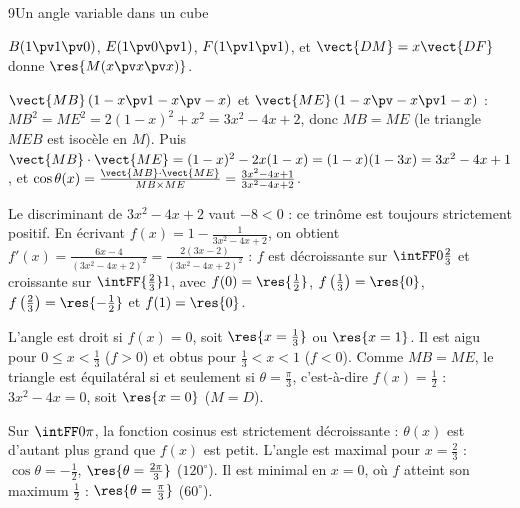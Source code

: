 \corrigesSouples
\begin{corrige}{9}{Un angle variable dans un cube}
\begin{questions}
  \item $B(1\pv1\pv0)$, $E(1\pv0\pv1)$, $F(1\pv1\pv1)$, et $\vect{DM}=x\vect{DF}$ donne $\res{M(x\pv x\pv x)}$.
  \item $\vect{MB}\,(1-x\pv1-x\pv-x)$ et $\vect{ME}\,(1-x\pv-x\pv1-x)$ : $MB^2=ME^2=2(1-x)^2+x^2=3x^2-4x+2$, donc $MB=ME$ (le
    triangle $MEB$ est isocèle en $M$). Puis $\vect{MB}\cdot\vect{ME}=(1-x)^2-2x(1-x)=(1-x)(1-3x)=3x^2-4x+1$, et
    $\cos\theta(x)=\frac{\vect{MB}\cdot\vect{ME}}{MB\times ME}=\frac{3x^2-4x+1}{3x^2-4x+2}$.
  \item Le discriminant de $3x^2-4x+2$ vaut $-8<0$ : ce trinôme est toujours strictement positif. En écrivant
    $f(x)=1-\frac{1}{3x^2-4x+2}$, on obtient $f'(x)=\frac{6x-4}{(3x^2-4x+2)^2}=\frac{2(3x-2)}{(3x^2-4x+2)^2}$ : $f$ est décroissante
    sur $\intFF0{\frac23}$ et croissante sur $\intFF{\frac23}1$, avec $f(0)=\res{\tfrac12}$, $f\left(\tfrac13\right)=\res{0}$,
    $f\left(\tfrac23\right)=\res{-\tfrac12}$ et $f(1)=\res{0}$.
  \item L'angle est droit si $f(x)=0$, soit $\res{x=\tfrac13}$ ou $\res{x=1}$. Il est aigu pour $0\leq x<\frac13$ ($f>0$) et obtus pour
    $\frac13<x<1$ ($f<0$). Comme $MB=ME$, le triangle est équilatéral si et seulement si $\theta=\frac{\pi}3$, c'est-à-dire
    $f(x)=\frac12$ : $3x^2-4x=0$, soit $\res{x=0}$ ($M=D$).
  \item Sur $\intFF0\pi$, la fonction cosinus est strictement décroissante : $\theta(x)$ est d'autant plus grand que $f(x)$ est petit.
    L'angle est maximal pour $x=\frac23$ : $\cos\theta=-\frac12$, $\res{\theta=\tfrac{2\pi}{3}}$ ($120^\circ$). Il est minimal en
    $x=0$, où $f$ atteint son maximum $\frac12$ : $\res{\theta=\tfrac{\pi}{3}}$ ($60^\circ$).
\end{questions}
\end{corrige}

